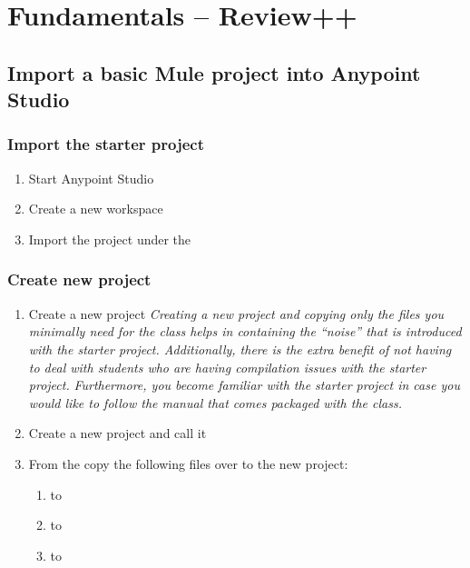 \chapter{Fundamentals -- Review++}
\section{Import a basic Mule project into Anypoint Studio}
\subsection{Import the starter project}
\begin{enumerate}
\item Start Anypoint Studio
\item Create a new workspace
\item Import the  project under the 
\end{enumerate}
\subsection{Create new project}
\begin{enumerate}[resume*]
\item Create a new project
  \newline
  \emph{
    Creating a new project and copying only the files you minimally need for the class helps in containing the ``noise'' that is introduced with the starter project.  Additionally, there is the extra benefit of not having to deal with students who are having compilation issues with the starter project.
  }
  \newline
  \emph{
    Furthermore, you become familiar with the starter project in case you would like to follow the manual that comes packaged with the class.
  }
\item Create a new project and call it 
\item From the  copy the following files over to the new project:
  \begin{enumerate}
  \item {} to 
  \item {} to 
  \item {} to 
  \end{enumerate}
\end{enumerate}

